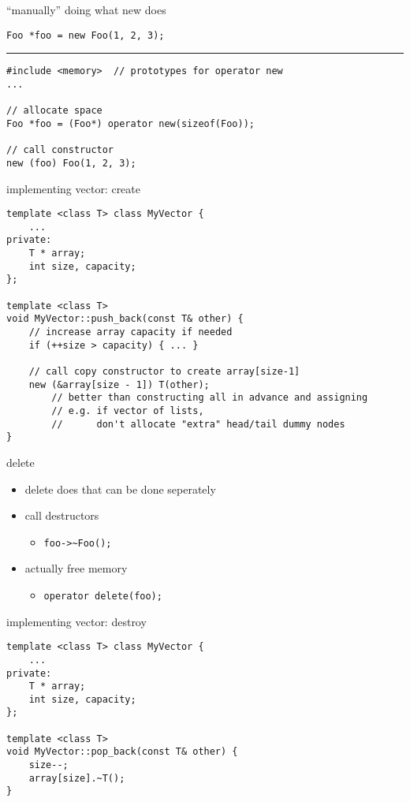 \begin{frame}[fragile,label=placementNew]{``manually'' doing what new does}
\lstset{language=C++}
\begin{lstlisting}
Foo *foo = new Foo(1, 2, 3);
\end{lstlisting}
\hrule
\begin{lstlisting}
#include <memory>  // prototypes for operator new
...

// allocate space
Foo *foo = (Foo*) operator new(sizeof(Foo));

// call constructor
new (foo) Foo(1, 2, 3);
\end{lstlisting}
\end{frame}

\begin{frame}[fragile,label=placementNewVector]{implementing vector: create}
\lstset{language=C++,style=smaller}
\begin{lstlisting}
template <class T> class MyVector {
    ...
private:
    T * array;
    int size, capacity;
};

template <class T>
void MyVector::push_back(const T& other) {
    // increase array capacity if needed
    if (++size > capacity) { ... }

    // call copy constructor to create array[size-1]
    new (&array[size - 1]) T(other);
        // better than constructing all in advance and assigning
        // e.g. if vector of lists,
        //      don't allocate "extra" head/tail dummy nodes
}
\end{lstlisting}
\end{frame}

\begin{frame}[fragile,label=deleteParts]{delete}
\lstset{language=C++}
\begin{itemize}
    \item delete does  that can be done seperately
    \vspace{.5cm}
    \item call destructors
        \begin{itemize}
        \item \lstinline|foo->~Foo();|
        \end{itemize}
    \item actually free memory
        \begin{itemize}
        \item \lstinline|operator delete(foo);|
        \end{itemize}
\end{itemize}
\end{frame}

\begin{frame}[fragile,label=manualDeleteVector]{implementing vector: destroy}
\lstset{language=C++,style=small}
\begin{lstlisting}
template <class T> class MyVector {
    ...
private:
    T * array;
    int size, capacity;
};

template <class T>
void MyVector::pop_back(const T& other) {
    size--;
    array[size].~T();
}
\end{lstlisting}
\end{frame}
